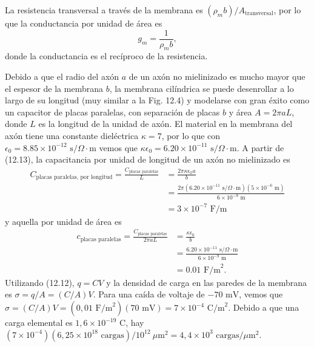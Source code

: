 \documentclass[12pt]{book}
\begin{document}
La resistencia transversal a través de la membrana es $(\rho_m b)/A_{\text{transversal}}$, por lo que la conductancia por unidad de área es
\begin{equation}
g_m = \frac{1}{\rho_m b}, \label{eq:12.50}
\end{equation}
donde la conductancia es el recíproco de la resistencia.

Debido a que el radio del axón $a$ de un axón no mielinizado es mucho mayor que el espesor de la membrana $b$, la membrana cilíndrica se puede desenrollar a lo largo de su longitud (muy similar a la Fig. 12.4) y modelarse con gran éxito como un capacitor de placas paralelas, con separación de placas $b$ y área $A = 2\pi a L$, donde $L$ es la longitud de la unidad de axón. El material en la membrana del axón tiene una constante dieléctrica $\kappa = 7$, por lo que con $\epsilon_0 = 8.85 \times 10^{-12}\text{ s/}\Omega\cdot\text{m}$ vemos que $\kappa\epsilon_0 = 6.20 \times 10^{-11}\text{ s/}\Omega\cdot\text{m}$. A partir de (12.13), la capacitancia por unidad de longitud de un axón no mielinizado es
\begin{align}
C_{\text{placas paralelas, por longitud}} = \frac{C_{\text{placas paralelas}}}{L} &= \frac{2\pi \kappa \epsilon_0 a}{b} \label{eq:12.51} \\
&= \frac{2\pi(6.20 \times 10^{-11}\text{ s/}\Omega\cdot\text{m})(5 \times 10^{-6}\text{ m})}{6 \times 10^{-9}\text{ m}} \label{eq:12.52} \\
&= 3 \times 10^{-7}\text{ F/m} \label{eq:12.53}
\end{align}
y aquella por unidad de área es
\begin{align}
c_{\text{placas paralelas}} = \frac{C_{\text{placas paralelas}}}{2\pi a L} &= \frac{\kappa \epsilon_0}{b} \label{eq:12.54} \\
&= \frac{6.20 \times 10^{-11}\text{ s/}\Omega\cdot\text{m}}{6 \times 10^{-9}\text{ m}} \label{eq:12.55} \\
&= 0.01\text{ F/m}^2. \label{eq:12.56}
\end{align}
Utilizando (12.12), $q = CV$ y la densidad de carga en las paredes de la membrana es $\sigma = q/A = (C/A)V$. Para una caída de voltaje de $-70\text{ mV}$, vemos que $\sigma = (C/A)V = (0{,}01\text{ F/m}^2)(70\text{ mV}) = 7 \times 10^{-4}\text{ C/m}^2$. Debido a que una carga elemental es $1{,}6 \times 10^{-19}\text{ C}$, hay $(7 \times 10^{-4})(6{,}25 \times 10^{18}\text{ cargas})/10^{12}\ \mu\text{m}^2 = 4{,}4 \times 10^3\text{ cargas}/\mu\text{m}^2$.
\end{document}
